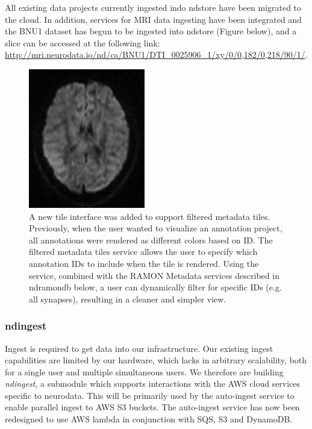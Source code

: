 \documentclass[simplex.tex]{subfiles}
\begin{document}
All existing data projects currently ingested indo ndstore have been migrated to the cloud. In addition, services for MRI data ingesting have been integrated and the BNU1 dataset has begun to be ingested into ndstore (Figure below), and a slice can be accessed at the following link: 
\href{http://mri.neurodata.io/nd/ca/BNU1/DTI_0025906_1/xy/0/0,182/0,218/90/1/}{http://mri.neurodata.io/nd/ca/BNU1/DTI\_0025906\_1/xy/0/0,182/0,218/90/1/}.  

\begin{figure}[h!]
\begin{cframed}
\centering
\includegraphics[width=2in]{../../figs/ndstore.png}
\caption{
A new tile interface was added to support filtered metadata tiles. Previously, when the user wanted to visualize an annotation project, all annotations were rendered as different colors based on ID. The filtered metadata tiles service allows the user to specify which annotation IDs to include when the tile is rendered. Using the service, combined with the RAMON Metadata services described in ndramondb below, a user can dynamically filter for specific IDs (e.g. all synapses), resulting in a cleaner and simpler view. 
}
\label{fig:ndstore}
\end{cframed}
\end{figure}


\subsubsection{ndingest}

Ingest is required to get data into our infrastructure.  Our existing ingest capabilities are limited by our hardware, which lacks in arbitrary scalability, both for a single user and multiple simultaneous users.  We therefore are building \textit{ndingest}, a submodule which supports interactions with the AWS cloud services specific to neurodata. This will be primarily used by the auto-ingest service to enable parallel ingest to AWS S3 buckets. The auto-ingest service has now been redesigned to use AWS lambda in conjunction with SQS, S3 and DynamoDB. 
\end{document}
